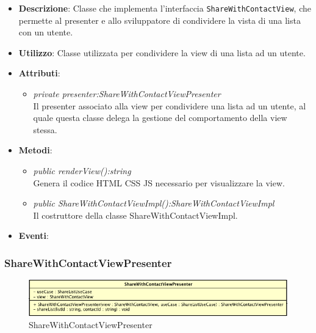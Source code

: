 \begin{itemize}
\item \textbf{Descrizione}: Classe che implementa l'interfaccia \texttt{ShareWithContactView}, che permette al presenter e allo sviluppatore di condividere la vista di una lista con un utente.
\item \textbf{Utilizzo}: Classe utilizzata per condividere la view di una lista ad un utente.
\item \textbf{Attributi}: 
\begin{itemize}
\item \textit{private presenter:ShareWithContactViewPresenter}\\
	Il presenter associato alla view per condividere una lista ad un utente, al quale questa classe delega la gestione del comportamento della view stessa.
\end{itemize}
\item \textbf{Metodi}:
\begin{itemize}
\item \textit{public renderView():string}\\
	Genera il codice HTML CSS JS necessario per visualizzare la view.
\item \textit{public ShareWithContactViewImpl():ShareWithContactViewImpl}\\
	Il costruttore della classe ShareWithContactViewImpl.
\end{itemize}
\item \textbf{Eventi}:
\end{itemize}

\subsubsection{ShareWithContactViewPresenter}

\label{ShareWithContactViewPresenter}
\begin{figure}[ht]
	\centering
	\includegraphics[scale=0.5]{Sezioni/SottosezioniST/img/app/ShareWithContactViewPresenter.png}
	\caption{ShareWithContactViewPresenter}
\end{figure}

